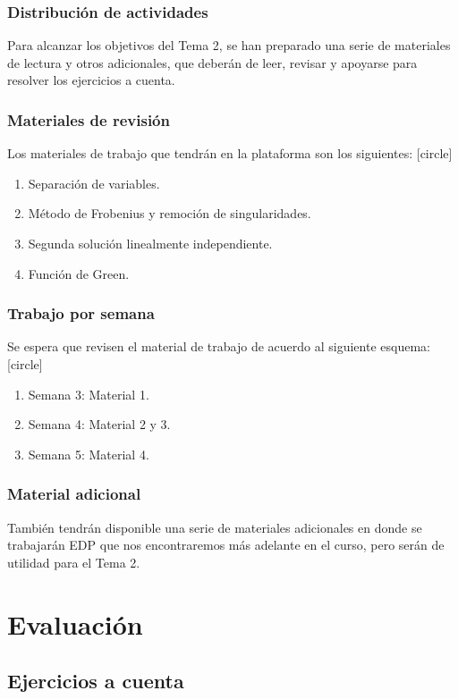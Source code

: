 \documentclass[12pt]{beamer}
\begin{document}
\begin{frame}
\frametitle{Distribución de actividades}
Para alcanzar los objetivos del Tema 2, se han preparado una serie de materiales de lectura y otros adicionales, que deberán de leer, revisar y apoyarse para resolver los ejercicios a cuenta.
\end{frame}
\begin{frame}
\frametitle{Materiales de revisión}
Los materiales de trabajo que tendrán en la plataforma son los siguientes:
[circle]
\begin{enumerate}[<+->]
\item Separación de variables.
\item Método de Frobenius y remoción de singularidades.
\item Segunda solución linealmente independiente.
\item Función de Green.
\end{enumerate}
\end{frame}
\begin{frame}
\frametitle{Trabajo por semana}
Se espera que revisen el material de trabajo de acuerdo al siguiente esquema:
[circle]
\begin{enumerate}[<+->]
\item Semana 3: Material 1.
\item Semana 4: Material 2 y 3.
\item Semana 5: Material 4.
\end{enumerate}
\end{frame}
\begin{frame}
\frametitle{Material adicional}
También tendrán disponible una serie de materiales adicionales en donde se trabajarán EDP que nos encontraremos más adelante en el curso, pero serán de utilidad para el Tema 2.
\end{frame}

\section{Evaluación}
\subsection{Ejercicios a cuenta}
\end{document}
